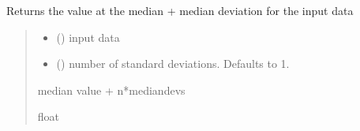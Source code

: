 \documentclass[letterpaper,10pt,english]{sphinxmanual}
\begin{document}
\begin{fulllineitems}
\label{\detokenize{micropolarray:micropolarray.utils.median_plus_std}}
\pysigstartsignatures
{}
\pysigstopsignatures
\sphinxAtStartPar
Returns the value at the median + median deviation for the input data
\begin{quote}\begin{description}
\begin{itemize}
\item {} 
\sphinxAtStartPar
{} () \textendash{} input data

\item {} 
\sphinxAtStartPar
{} (\sphinxstyleliteralemphasis{\sphinxupquote{, }}) \textendash{} number of standard deviations. Defaults to 1.

\end{itemize}

\sphinxAtStartPar
median value + n*mediandevs

\sphinxAtStartPar
float

\end{description}\end{quote}

\end{fulllineitems}

\end{document}
